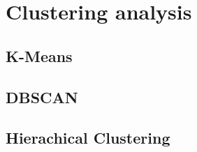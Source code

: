 \section{Clustering analysis}
\subsection{K-Means}
\subsection{DBSCAN}
\subsection{Hierachical Clustering}